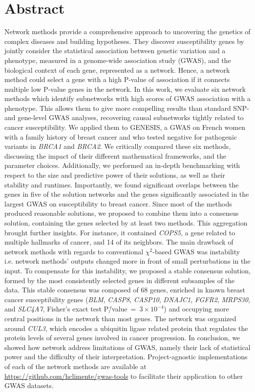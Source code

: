 \documentclass[10pt,letterpaper]{article}
\begin{document}
\section*{Abstract}
Network methods provide a comprehensive approach to uncovering the genetics of complex diseases and building hypotheses. They discover susceptibility genes by jointly consider the statistical association between genetic variation and a phenotype, measured in a genome-wide association study (GWAS), and the biological context of each gene, represented as a network. Hence, a network method could select a gene with a high P-value of association if it connects multiple low P-value genes in the network. In this work, we evaluate six network methods which identify subnetworks with high scores of GWAS association with a phenotype. This allows them to give more compelling results than standard SNP- and gene-level GWAS analyses, recovering causal subnetworks tightly related to cancer susceptibility. We applied them to GENESIS, a GWAS on French women with a family history of breast cancer and who tested negative for pathogenic variants in \emph{BRCA1} and \emph{BRCA2}. We critically compared these six methods, discussing the impact of their different mathematical frameworks, and the parameter choices. Additionally, we performed an in-depth benchmarking with respect to the size and predictive power of their solutions, as well as their stability and runtimes. Importantly, we found significant overlaps between the genes in five of the solution networks and the genes significantly associated in the largest GWAS on susceptibility to breast cancer. Since most of the methods produced reasonable solutions, we proposed to combine them into a consensus solution, containing the genes selected by at least two methods. This aggregation brought further insights. For instance, it contained \emph{COPS5}, a gene related to multiple hallmarks of cancer, and 14 of its neighbors. The main drawback of network methods with regards to conventional $\chi^2$-based GWAS was instability i.e. network methods' outputs changed more in front of small perturbations in the input. To compensate for this instability, we proposed a stable consensus solution, formed by the most consistently selected genes in different subsamples of the data. This stable consensus was composed of 68 genes, enriched in known breast cancer susceptibility genes (\emph{BLM}, \emph{CASP8}, \emph{CASP10}, \emph{DNAJC1}, \emph{FGFR2}, \emph{MRPS30}, and \emph{SLC4A7}, Fisher's exact test P\=/value~=~$3 \times 10^{-4}$) and occupying more central positions in the network than most genes. The network was organized around \emph{CUL3}, which encodes a ubiquitin ligase related protein that regulates the protein levels of several genes involved in cancer progression. In conclusion, we showed how network address limitations of GWAS, namely their lack of statistical power and the difficulty of their interpretation. Project-agnostic implementations of each of the network methods are available at \url{https://github.com/hclimente/gwas-tools} to facilitate their application to other GWAS datasets.
\end{document}
